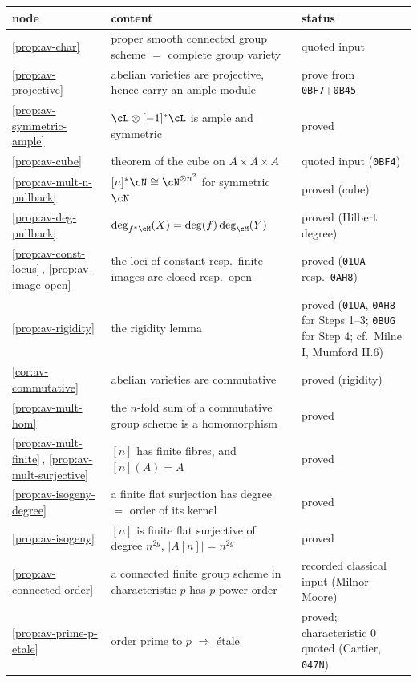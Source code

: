\documentclass[11pt]{article}
\theoremstyle{plain}
\theoremstyle{definition}
\newcommand{\Cref}[1]{\hyperref[#1]{\ref{#1}}\,\hyperref[#1]{\nameref*{#1}}}
\begin{document}
\begin{center}
\footnotesize
\begin{tabular}{@{}>{\raggedright\arraybackslash}p{4.6cm}>{\raggedright\arraybackslash}p{6.4cm}>{\raggedright\arraybackslash}p{4.4cm}@{}}
\hline
\textbf{node} & \textbf{content} & \textbf{status} \\
\hline
\Cref{prop:av-char} & proper smooth connected group scheme $=$ complete group variety & quoted input \\
\Cref{prop:av-projective} & abelian varieties are projective, hence carry an ample module & prove from \texttt{0BF7}+\texttt{0B45} \\
\Cref{prop:av-symmetric-ample} & $\cL\otimes[-1]^*\cL$ is ample and symmetric & proved \\
\Cref{prop:av-cube} & theorem of the cube on $A\times A\times A$ & quoted input (\texttt{0BF4}) \\
\Cref{prop:av-mult-n-pullback} & $[n]^*\cN\cong\cN^{\otimes n^2}$ for symmetric $\cN$ & proved (cube) \\
\Cref{prop:av-deg-pullback} & $\deg_{f^*\cM}(X)=\deg(f)\deg_{\cM}(Y)$ & proved (Hilbert degree) \\
\Cref{prop:av-const-locus}, \Cref{prop:av-image-open} & the loci of constant resp.\ finite images are closed resp.\ open & proved (\texttt{01UA} resp.\ \texttt{0AH8}) \\
\Cref{prop:av-rigidity} & the rigidity lemma & proved (\texttt{01UA}, \texttt{0AH8} for Steps 1--3; \texttt{0BUG} for Step 4; cf.\ Milne I, Mumford II.6) \\
\Cref{cor:av-commutative} & abelian varieties are commutative & proved (rigidity) \\
\Cref{prop:av-mult-hom} & the $n$-fold sum of a commutative group scheme is a homomorphism & proved \\
\Cref{prop:av-mult-finite}, \Cref{prop:av-mult-surjective} & $[n]$ has finite fibres, and $[n](A)=A$ & proved \\
\Cref{prop:av-isogeny-degree} & a finite flat surjection has degree $=$ order of its kernel & proved \\
\Cref{prop:av-isogeny} & $[n]$ is finite flat surjective of degree $n^{2g}$, $\lvert A[n]\rvert=n^{2g}$ & proved \\
\Cref{prop:av-connected-order} & a connected finite group scheme in characteristic $p$ has $p$-power order & recorded classical input (Milnor--Moore) \\
\Cref{prop:av-prime-p-etale} & order prime to $p$ $\Rightarrow$ \'etale & proved; characteristic $0$ quoted (Cartier, \texttt{047N}) \\

\end{tabular}
\end{center}
\end{document}
